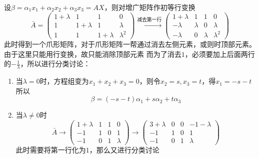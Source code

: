 \begin{solution}
    设$\beta = \alpha_1 x_1 + \alpha_2 x_2 + \alpha_3 x_3 = AX$，则对增广矩阵作初等行变换
    \[
        \bar{A}=
        \left(\begin{array}{ccc|c}
                1+\lambda & 1         & 1         & 0         \\
                1         & 1+\lambda & 1         & \lambda   \\
                1         & 1         & 1+\lambda & \lambda^2
            \end{array}\right)
        \xrightarrow{\text{减去第一行}}
        \left(\begin{array}{ccc|c}
                1+\lambda & 1       & 1       & 0         \\
                -\lambda  & \lambda & 0       & \lambda   \\
                -\lambda  & 0       & \lambda & \lambda^2
            \end{array}\right)
    \]
    此时得到一个爪形矩阵，对于爪形矩阵一帮通过消去左侧元素，或则时顶部元素。由于这里只能用行变换，故只能消除顶部元素
    而为了消去$1$，必须要加上后面两行的$-\frac{1}{\lambda}$，所以进行分类讨论：
    \begin{enumerate}[(1)]
        \item 当$\lambda=0$时，方程组变为$x_1+x_2+x_3 = 0$，则令$x_2 = s,x_3=t$，得$x_1 = -s-t$所以
              \[ \beta = (-s-t)\alpha_1 + s\alpha_2 + t\alpha_3 \]
        \item 当$\lambda\neq 0 $时
              \[
                  \bar{A}
                  \longrightarrow
                  \left(\begin{array}{ccc|c}
                          1+\lambda & 1 & 1 & 0       \\
                          -1        & 1 & 0 & 1       \\
                          -1        & 0 & 1 & \lambda
                      \end{array}\right)
                  \longrightarrow
                  \left(\begin{array}{ccc|c}
                          3+\lambda & 0 & 0 & -1-\lambda \\
                          -1        & 1 & 0 & 1          \\
                          -1        & 0 & 1 & \lambda
                      \end{array}\right)
              \]
              此时需要将第一行化为$1$，那么又进行分类讨论

\end{enumerate}
\end{solution}
